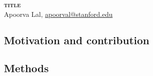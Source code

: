\documentclass[12pt,reqno]{amsart} %
\begin{document}
\begin{center}
\large
\textsc{\textbf{
    title 
  }}
  \vspace{1em} \\
\normalsize
Apoorva Lal, \href{apoorval@stanford.edu}{apoorval@stanford.edu}
\end{center}

\subsection*{Motivation and contribution}

\subsection*{Methods}


\clearpage

\printbibliography
\end{document}
